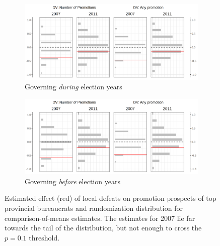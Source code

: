 \documentclass[12pt]{article}\usepackage[]{graphicx}\usepackage[]{color}
\newcommand{\1}{\mathbbm{1}}
\begin{document}
\begin{figure}[!htbp]
	\centering
	\begin{subfigure}[!htbp]{\linewidth}
		\includegraphics[width=\textwidth]{figure/SYP_RI_LEAD.png}
		\caption{Governing \textit{during} election years}
		\label{fig:Lead}
	\end{subfigure}
	
	\begin{subfigure}[!htbp]{\linewidth}
		\includegraphics[width=\textwidth]{figure/SYP_RI_LEAD_LAG.png}
		\caption{Governing \textit{before} election years}
		\label{fig:Lead_Lag}
	\end{subfigure}
	\caption[Estimated treatment effects of on promotion]{Estimated effect (red) of local defeats on promotion prospects of top provincial bureaucrats and randomization distribution for comparison-of-means estimates. The estimates for 2007 lie far towards the tail of the distribution, but not enough to cross the $p=0.1$ threshold.}
\end{figure}
\end{document}
